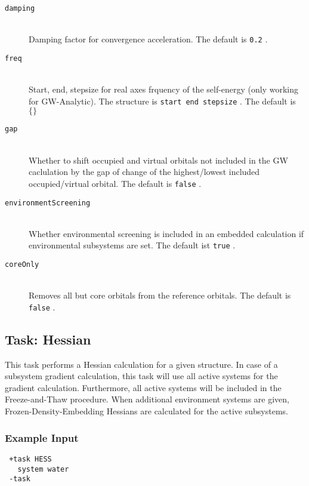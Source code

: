 \documentclass[bibliography=totocnumbered,a4paper,10pt,oneside]{scrbook}
\newcommand{\ttt}[1]{%
  \begingroup\setlength{\fboxsep}{1pt}%
  \colorbox{serenity-green!30}{\texttt{\hspace*{2pt}\vphantom{(g}#1\hspace*{2pt}}}%
  \endgroup
}
\begin{document}
\begin{description}
  \item [\texttt{damping}]\hfill \\
  Damping factor for convergence acceleration. The default is \ttt{0.2}.
  \item [\texttt{freq}]\hfill \\
  Start, end, stepsize for real axes frquency of the self-energy (only working for GW-Analytic). The structure is \ttt{start end stepsize}. The default is \ttt{$\{\}$}
  \item [\texttt{gap}]\hfill \\
  Whether to shift occupied and virtual orbitals not included in the GW caclulation by the gap of change of the highest/lowest included occupied/virtual orbital. The default is \ttt{false}.
  \item [\texttt{environmentScreening}]\hfill \\
  Whether environmental screening is included in an embedded calculation if environmental subsystems are set. The default ist \ttt{true}.
  \item [\texttt{coreOnly}]\hfill \\
  Removes all but core orbitals from the reference orbitals. The default is \ttt{false}.
\end{description}


\subsection{Task: Hessian}
This task performs a Hessian calculation for a given structure. In case of a subsystem gradient calculation, this task will use all active systems for the gradient calculation. Furthermore, all active systems will be included in the Freeze-and-Thaw procedure. When additional environment systems are given, Frozen-Density-Embedding Hessians are calculated for the active subsystems.
\subsubsection{Example Input}
\begin{lstlisting}
 +task HESS
   system water
 -task
\end{lstlisting}
\end{document}
